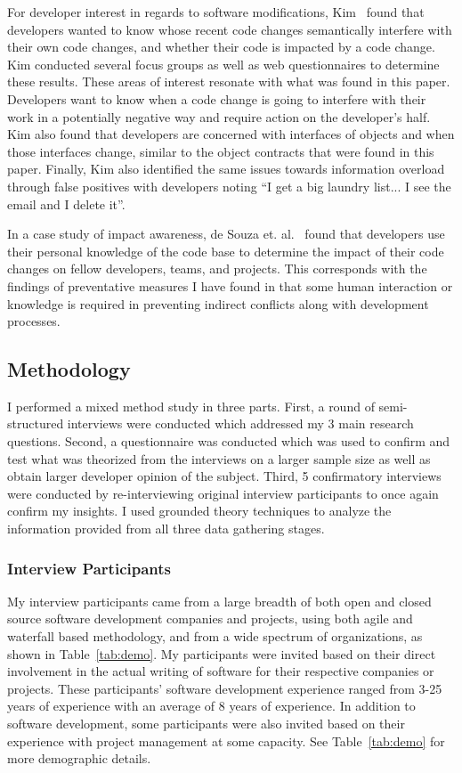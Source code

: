 For developer interest in regards to software modifications, Kim~\cite{Kim:2011:ESA} found that developers wanted to know whose
recent code changes semantically interfere with their own code changes, and whether their code is impacted by a code change.
Kim conducted several focus groups as well as web questionnaires to determine these results. These areas of interest resonate with what was
found in this paper. Developers want to know when a code change is going to interfere with their work in a potentially negative way and
require action on the developer's half.  Kim
also found that developers are concerned with interfaces of objects and when those interfaces change, similar to the object contracts that
were found in this paper. Finally, Kim also identified the same issues towards information overload through false positives with developers
noting ``I get a big laundry list... I see the email and I delete it''.

In a case study of impact awareness, de Souza et. al.~\cite{deSouza:2008:ESS} found that developers use their personal knowledge of the
code base to determine the impact of their code changes on fellow developers, teams, and projects. This corresponds with the findings of
preventative measures I have found in that some human interaction or knowledge is required in preventing indirect conflicts along with
development processes.

\subsection{Methodology}
\label{sec:exp-meth}

I performed a mixed method study in three parts. First, a round of semi-structured interviews were conducted which 
addressed my 3 main research questions. Second, a questionnaire was conducted
which was used to confirm and test what was theorized from the interviews on a larger sample size as well as obtain
larger developer opinion of the subject. Third, 5 confirmatory interviews were conducted by re-interviewing original
interview participants to once again confirm my insights.
I used grounded theory techniques to analyze the information provided from all three data gathering stages.

\subsubsection{Interview Participants}

My interview participants came from a large breadth of both open and closed source software development companies
and projects, using both  agile and waterfall based methodology, and from a wide spectrum of organizations, as shown in Table~\ref{tab:demo}.
My participants were invited based on their direct involvement in the actual writing of software for
their respective companies or projects. These participants' software development experience ranged from 3-25 years of experience
with an average of 8 years of experience.
In addition to software development, some participants were also invited based on their experience with project management
at some capacity. See Table~\ref{tab:demo} for more demographic details.

